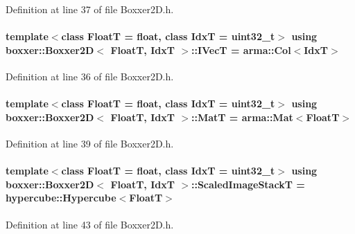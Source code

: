 Definition at line 37 of file Boxxer2\+D.\+h.

\paragraph[{\texorpdfstring{I\+VecT}{IVecT}}]{\setlength{\rightskip}{0pt plus 5cm}template$<$class FloatT  = float, class IdxT  = uint32\+\_\+t$>$ using {\bf boxxer\+::\+Boxxer2D}$<$ FloatT, IdxT $>$\+::{\bf I\+VecT} =  arma\+::\+Col$<$IdxT$>$}\hypertarget{classboxxer_1_1Boxxer2D_acb4dc89c7e1bd2099e7de7b83621ba4f}{}\label{classboxxer_1_1Boxxer2D_acb4dc89c7e1bd2099e7de7b83621ba4f}


Definition at line 36 of file Boxxer2\+D.\+h.

\paragraph[{\texorpdfstring{MatT}{MatT}}]{\setlength{\rightskip}{0pt plus 5cm}template$<$class FloatT  = float, class IdxT  = uint32\+\_\+t$>$ using {\bf boxxer\+::\+Boxxer2D}$<$ FloatT, IdxT $>$\+::{\bf MatT} =  arma\+::\+Mat$<$FloatT$>$}\hypertarget{classboxxer_1_1Boxxer2D_a4af9f3e10a7ceb1c20e1d731263d9aeb}{}\label{classboxxer_1_1Boxxer2D_a4af9f3e10a7ceb1c20e1d731263d9aeb}


Definition at line 39 of file Boxxer2\+D.\+h.

\paragraph[{\texorpdfstring{Scaled\+Image\+StackT}{ScaledImageStackT}}]{\setlength{\rightskip}{0pt plus 5cm}template$<$class FloatT  = float, class IdxT  = uint32\+\_\+t$>$ using {\bf boxxer\+::\+Boxxer2D}$<$ FloatT, IdxT $>$\+::{\bf Scaled\+Image\+StackT} =  hypercube\+::\+Hypercube$<$FloatT$>$}\hypertarget{classboxxer_1_1Boxxer2D_a2937a772edcf9cec5f617fbcf1d8a6fe}{}\label{classboxxer_1_1Boxxer2D_a2937a772edcf9cec5f617fbcf1d8a6fe}


Definition at line 43 of file Boxxer2\+D.\+h.

